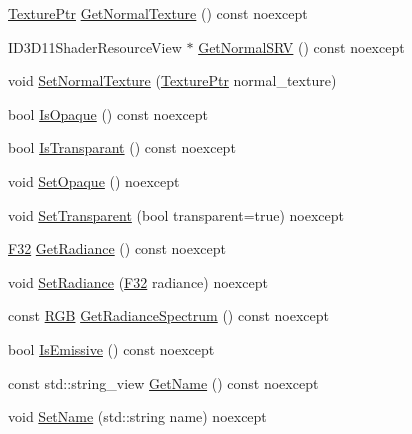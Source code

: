 \begin{DoxyCompactItemize}
\item 
\mbox{\hyperlink{namespacemage_1_1rendering_a6f3ae54f825328465b0cdde0f0de4a36}{Texture\+Ptr}} \mbox{\hyperlink{classmage_1_1rendering_1_1_material_a1ae7786ebd627d3e7ecaf2dc671f497d}{Get\+Normal\+Texture}} () const noexcept
\item 
I\+D3\+D11\+Shader\+Resource\+View $\ast$ \mbox{\hyperlink{classmage_1_1rendering_1_1_material_a8617392cee8e8609671be3f4147a5934}{Get\+Normal\+S\+RV}} () const noexcept
\item 
void \mbox{\hyperlink{classmage_1_1rendering_1_1_material_a1a1ae2ba12c62c1d076f04124f1f64f6}{Set\+Normal\+Texture}} (\mbox{\hyperlink{namespacemage_1_1rendering_a6f3ae54f825328465b0cdde0f0de4a36}{Texture\+Ptr}} normal\+\_\+texture)
\item 
bool \mbox{\hyperlink{classmage_1_1rendering_1_1_material_af750917e67bdaf7e47129617102887ab}{Is\+Opaque}} () const noexcept
\item 
bool \mbox{\hyperlink{classmage_1_1rendering_1_1_material_ae60d1b61ebd38d3e329a519b2f2c3dad}{Is\+Transparant}} () const noexcept
\item 
void \mbox{\hyperlink{classmage_1_1rendering_1_1_material_a23741c39e6ad9a8d12b7793bc3da4131}{Set\+Opaque}} () noexcept
\item 
void \mbox{\hyperlink{classmage_1_1rendering_1_1_material_a8da0e0ed4df1e9ce0c7381d88b6d6c48}{Set\+Transparent}} (bool transparent=true) noexcept
\item 
\mbox{\hyperlink{namespacemage_aa97e833b45f06d60a0a9c4fc22ae02c0}{F32}} \mbox{\hyperlink{classmage_1_1rendering_1_1_material_a5bfbc1bc67731126af7cf33b286bb07b}{Get\+Radiance}} () const noexcept
\item 
void \mbox{\hyperlink{classmage_1_1rendering_1_1_material_ae41261db79de572b75e2615abadc2aaa}{Set\+Radiance}} (\mbox{\hyperlink{namespacemage_aa97e833b45f06d60a0a9c4fc22ae02c0}{F32}} radiance) noexcept
\item 
const \mbox{\hyperlink{structmage_1_1_r_g_b}{R\+GB}} \mbox{\hyperlink{classmage_1_1rendering_1_1_material_af8a3171b34409593673f1279e3f9ba29}{Get\+Radiance\+Spectrum}} () const noexcept
\item 
bool \mbox{\hyperlink{classmage_1_1rendering_1_1_material_acf52f6bc5f849928751e10157bdb3c3c}{Is\+Emissive}} () const noexcept
\item 
const std\+::string\+\_\+view \mbox{\hyperlink{classmage_1_1rendering_1_1_material_a0dcfe76cd03607242f6d2ceaccb83f5b}{Get\+Name}} () const noexcept
\item 
void \mbox{\hyperlink{classmage_1_1rendering_1_1_material_aacbd397564b9995bd66c4b7d16553c1c}{Set\+Name}} (std\+::string name) noexcept
\end{DoxyCompactItemize}
